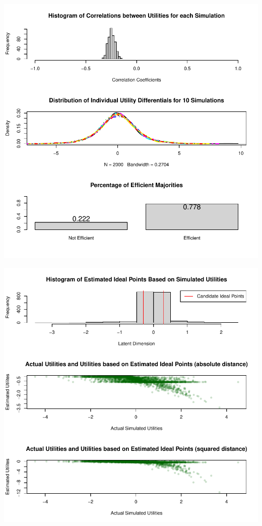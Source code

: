 \documentclass[12pt]{article}\usepackage[]{graphicx}\usepackage[]{color}
\makeatletter
\def\maxwidth{ %
  \ifdim\Gin@nat@width>\linewidth
    \linewidth
  \else
    \Gin@nat@width
  \fi
}
\newenvironment{knitrout}{}{} %
\makeatother
\begin{document}
\begin{knitrout}
\color{fgcolor}
\includegraphics[width=\maxwidth]{figure/unnamed-chunk-101} 

\includegraphics[width=\maxwidth]{figure/unnamed-chunk-102} 

\end{knitrout}
\end{document}
